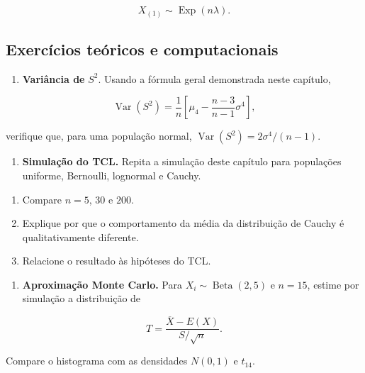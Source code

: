 \documentclass[
  letterpaper,
  DIV=11,
  numbers=noendperiod]{scrreprt}
\providecommand{\tightlist}{%
  \setlength{\itemsep}{0pt}\setlength{\parskip}{0pt}}\usepackage{longtable,booktabs,array}
\begin{document}
\[X_{(1)}\sim\operatorname{Exp}(n\lambda).\]

\subsection*{Exercícios teóricos e
computacionais}\label{exercuxedcios-teuxf3ricos-e-computacionais}

\begin{enumerate}
\def\labelenumi{\arabic{enumi}.}
\setcounter{enumi}{16}
\tightlist
\item
  \textbf{Variância de} \(S^2\). Usando a fórmula geral demonstrada
  neste capítulo,
\end{enumerate}

\[\operatorname{Var}(S^2)
=
\frac{1}{n}
\left[
\mu_4-\frac{n-3}{n-1}\sigma^4
\right],\]

verifique que, para uma população normal,
\(\operatorname{Var}(S^2)=2\sigma^4/(n-1)\).

\begin{enumerate}
\def\labelenumi{\arabic{enumi}.}
\setcounter{enumi}{17}
\tightlist
\item
  \textbf{Simulação do TCL.} Repita a simulação deste capítulo para
  populações uniforme, Bernoulli, lognormal e Cauchy.
\end{enumerate}

\begin{enumerate}
\def\labelenumi{\alph{enumi}.}
\item
  Compare \(n=5\), \(30\) e \(200\).
\item
  Explique por que o comportamento da média da distribuição de Cauchy é
  qualitativamente diferente.
\item
  Relacione o resultado às hipóteses do TCL.
\end{enumerate}

\begin{enumerate}
\def\labelenumi{\arabic{enumi}.}
\setcounter{enumi}{18}
\tightlist
\item
  \textbf{Aproximação Monte Carlo.} Para
  \(X_i\sim\operatorname{Beta}(2,5)\) e \(n=15\), estime por simulação a
  distribuição de
\end{enumerate}

\[T=\frac{\overline{X}-E(X)}{S/\sqrt{n}}.\]

Compare o histograma com as densidades \(N(0,1)\) e \(t_{14}\).
\end{document}
